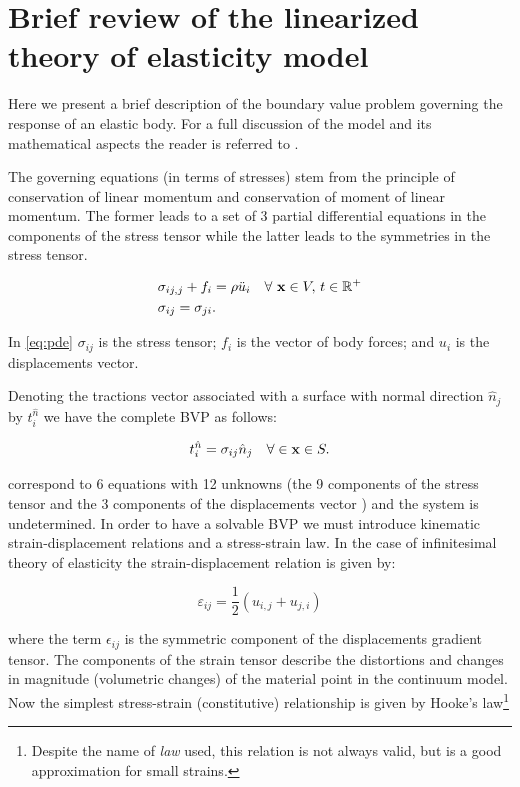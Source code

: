 \section{Brief review of the linearized theory of elasticity model}
Here we present a brief description of the boundary value problem governing the response of an elastic body. For a full discussion of the model and its mathematical aspects the reader is referred to \cite{shames1997elastic}.

The governing equations (in terms of stresses) stem from the principle of conservation of linear momentum and conservation of moment of linear momentum. The former leads to a set of 3 partial differential equations in the components of the stress tensor while the latter leads to the symmetries in the stress tensor.

\begin{equation} \label{eq:pde}
\begin{aligned}
&\sigma_{ij,j} + {f_i} = \rho\ddot{u}_i \quad \forall\ \vb{x} \in V,\, t \in \mathbb{R}^{+}\\
&\sigma_{ij}=\sigma _{ji}.
\end{aligned} 
\end{equation}

In \cref{eq:pde} $\sigma_{ij}$ is the stress tensor; $f_i$ is the vector of body forces; and $u_i$ is the displacements vector.

Denoting the tractions vector associated with a surface with normal direction $\hat{n}_{j}$ by $t_i^{\hat n}$ we have the complete BVP as follows:

\begin{equation} \label{eq:bcs}
t_i^{\hat n} = \sigma_{ij} \hat{n}_{j} \quad \forall \in \vb{x} \in S.
\end{equation}

 correspond to 6 equations with 12 unknowns (the 9 components of the stress tensor and the 3 components of the displacements vector ) and the system is undetermined. In order to have a solvable BVP we must introduce kinematic strain-displacement relations and a stress-strain law. In the case of infinitesimal theory of elasticity the strain-displacement relation is given by:

\begin{equation}\label{eq:kin}
\varepsilon_{ij} = \frac{1}{2}(u_{i,j} + u_{j,i})
\end{equation}

where the term $\epsilon_{ij}$ is the symmetric component of the displacements gradient tensor. The components of the strain tensor describe the distortions and changes in magnitude (volumetric changes) of the material point in the continuum model. Now the simplest stress-strain (constitutive) relationship is given by Hooke's law\footnote{Despite the name of \emph{law} used, this relation is not always valid, but is a good approximation for small strains.}

